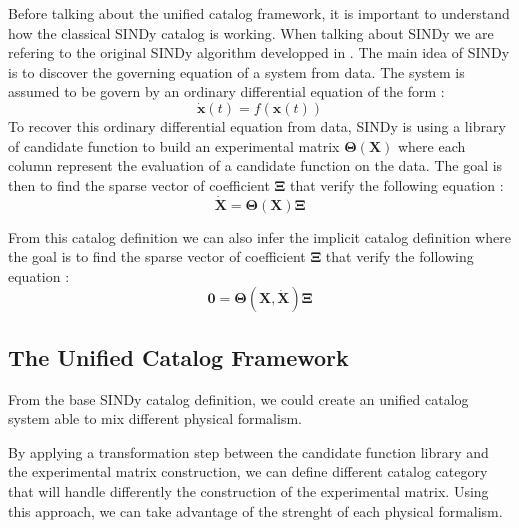 \documentclass[12pt]{article}
\begin{document}
Before talking about the unified catalog framework, it is important to understand how the classical SINDy catalog is working. When talking about SINDy we are refering to the original SINDy algorithm developped in \cite{bruntonDiscoveringGoverningEquations2016}. The main idea of SINDy is to discover the governing equation of a system from data. The system is assumed to be govern by an ordinary differential equation of the form :
\begin{equation}
	\dot{\mathbf{x}}(t) = f(\mathbf{x}(t))
\end{equation}
To recover this ordinary differential equation from data, SINDy is using a library of candidate function to build an experimental matrix $\mathbf{\Theta}(\mathbf{X})$ where each column represent the evaluation of a candidate function on the data. The goal is then to find the sparse vector of coefficient $\mathbf{\Xi}$ that verify the following equation :
\begin{equation}
	\dot{\mathbf{X}} = \mathbf{\Theta}(\mathbf{X})\mathbf{\Xi}
\end{equation}

From this catalog definition we can also infer the implicit catalog definition where the goal is to find the sparse vector of coefficient $\mathbf{\Xi}$ that verify the following equation :
\begin{equation}
	\mathbf{0} = \mathbf{\Theta}(\mathbf{X}, \dot{\mathbf{X}})\mathbf{\Xi}
\end{equation}

\subsection*{The Unified Catalog Framework}

From the base SINDy catalog definition, we could create an unified catalog system able to mix different physical formalism.

By applying a transformation step between the candidate function library and the experimental matrix construction, we can define different catalog category that will handle differently the construction of the experimental matrix. Using this approach, we can take advantage of the strenght of each physical formalism.
\end{document}
